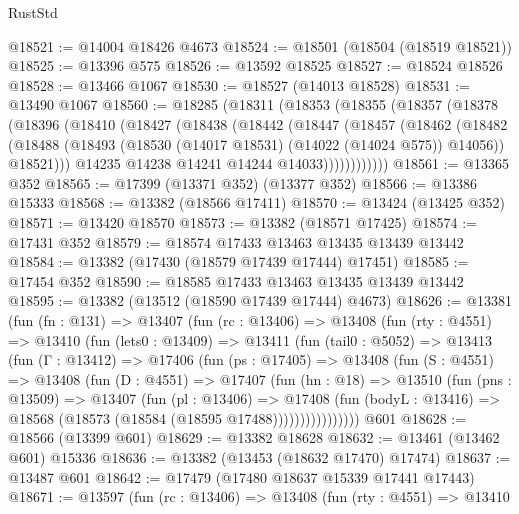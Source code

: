 \begin{lexlean}{RustStd}
\begin{coremodule}
@18521 := @14004 @18426 @4673
@18524 := @18501 (@18504 (@18519 @18521))
@18525 := @13396 @575
@18526 := @13592 @18525
@18527 := @18524 @18526
@18528 := @13466 @1067
@18530 := @18527 (@14013 @18528)
@18531 := @13490 @1067
@18560 := @18285
    (@18311
      (@18353
        (@18355
          (@18357
            (@18378
              (@18396
                (@18410
                  (@18427
                    (@18438
                      (@18442
                        (@18447
                          (@18457
                            (@18462
                              (@18482
                                (@18488
                                  (@18493 (@18530 (@14017 @18531) (@14022 (@14024 @575)) @14056))
                                  @18521)))
                            @14235
                            @14238
                            @14241
                            @14244
                            @14033))))))))))))
@18561 := @13365 @352
@18565 := @17399 (@13371 @352) (@13377 @352)
@18566 := @13386 @15333
@18568 := @13382 (@18566 @17411)
@18570 := @13424 (@13425 @352)
@18571 := @13420 @18570
@18573 := @13382 (@18571 @17425)
@18574 := @17431 @352
@18579 := @18574 @17433 @13463 @13435 @13439 @13442
@18584 := @13382 (@17430 (@18579 @17439 @17444) @17451)
@18585 := @17454 @352
@18590 := @18585 @17433 @13463 @13435 @13439 @13442
@18595 := @13382 (@13512 (@18590 @17439 @17444) @4673)
@18626 := @13381
    (fun (fn : @131) =>
    @13407
      (fun (rc : @13406) =>
      @13408
        (fun (rty : @4551) =>
        @13410
          (fun (lets0 : @13409) =>
          @13411
            (fun (tail0 : @5052) =>
            @13413
              (fun (Γ : @13412) =>
              @17406
                (fun (ps : @17405) =>
                @13408
                  (fun (S : @4551) =>
                  @13408
                    (fun (D : @4551) =>
                    @17407
                      (fun (hn : @18) =>
                      @13510
                        (fun (pns : @13509) =>
                        @13407
                          (fun (pl : @13406) =>
                          @17408
                            (fun (bodyL : @13416) =>
                            @18568 (@18573 (@18584 (@18595 @17488))))))))))))))))
    @601
@18628 := @18566 (@13399 @601)
@18629 := @13382 @18628
@18632 := @13461 (@13462 @601) @15336
@18636 := @13382 (@13453 (@18632 @17470) @17474)
@18637 := @13487 @601
@18642 := @17479 (@17480 @18637 @15339 @17441 @17443)
@18671 := @13597
    (fun (rc : @13406) =>
    @13408
      (fun (rty : @4551) =>
      @13410

\end{coremodule}
\end{lexlean}
